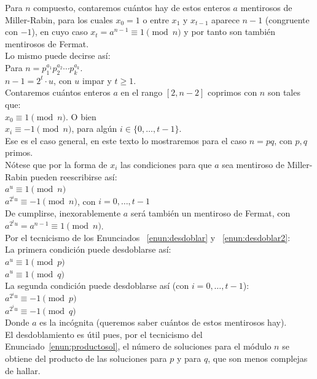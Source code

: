 Para $n$ compuesto, contaremos cuántos hay de estos enteros $a$ mentirosos de Miller-Rabin, para los cuales $x_0=1$ o entre $x_1$ y $x_{t-1}$ aparece $n-1$ (congruente con $-1$), en cuyo caso $x_t=a^{n-1} \equiv 1 \pmod n$ y por tanto son también mentirosos de Fermat. \\
Lo mismo puede decirse así:\\
Para  $n = p_1^{a_1} p_2^{a_2} \cdots p_k^{a_k}$. \\
$n-1 = 2^t \cdot u$, con $u$ impar y $t \geq 1$. \\
Contaremos cuántos enteros $a$ en el rango $[2,n-2]$ coprimos con $n$ son tales que: \\
$x_0 \equiv 1 \pmod n$. O bien \\
$x_i \equiv -1 \pmod n$, para algún $i \in \{0,\dots,t-1\}$. \\

Ese es el caso general, en este texto lo mostraremos para el caso $n=pq$, con $p,q$ primos. \\

Nótese que por la forma de $x_i$ las condiciones para que $a$ sea mentiroso de Miller-Rabin pueden reescribirse así: \\
$a^{u} \equiv 1 \pmod n$ \\
$a^{2^{i}u} \equiv -1 \pmod n$, con $i=0, \dots, t-1$\\
De cumplirse, inexorablemente $a$ será también un mentiroso de Fermat, con \\
$a^{2^{t}u} = a^{n-1} \equiv 1 \pmod n$. \\

Por el tecnicismo de los Enunciados ~\ref{enun:desdoblar} y ~\ref{enun:desdoblar2}: \\
La primera condición puede desdoblarse así: \\
$a^u \equiv 1 \pmod p$\\
$a^u \equiv 1 \pmod q$\\
La segunda condición puede desdoblarse así (con $i=0, \dots, t-1$): \\
$a^{2^{i}u} \equiv -1 \pmod p$\\
$a^{2^{i}u} \equiv -1 \pmod q$\\

Donde $a$ es la incógnita (queremos saber cuántos de estos mentirosos hay). \\
El desdoblamiento es útil pues, por el tecnicismo del Enunciado~\ref{enun:productosol}, el número de soluciones para el módulo $n$ se obtiene del producto de las soluciones para $p$ y para $q$, que son menos complejas de hallar.

